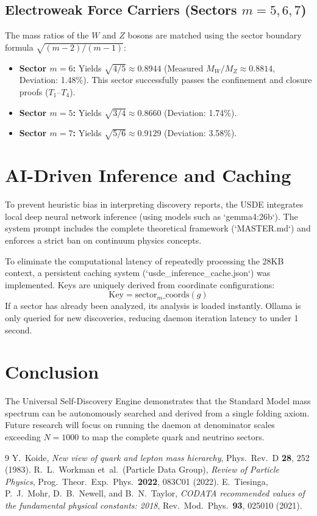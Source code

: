 \documentclass[11pt,a4paper]{article}
\begin{document}
\subsection{Electroweak Force Carriers (Sectors $m=5, 6, 7$)}
The mass ratios of the $W$ and $Z$ bosons are matched using the sector boundary formula $\sqrt{(m-2)/(m-1)}$:
\begin{itemize}
    \item \textbf{Sector $m=6$:} Yields $\sqrt{4/5} \approx 0.8944$ (Measured $M_W/M_Z \approx 0.8814$, Deviation: 1.48\%). This sector successfully passes the confinement and closure proofs ($T_1$--$T_4$).
    \item \textbf{Sector $m=5$:} Yields $\sqrt{3/4} \approx 0.8660$ (Deviation: 1.74\%).
    \item \textbf{Sector $m=7$:} Yields $\sqrt{5/6} \approx 0.9129$ (Deviation: 3.58\%).
\end{itemize}

\section{AI-Driven Inference and Caching}
To prevent heuristic bias in interpreting discovery reports, the USDE integrates local deep neural network inference (using models such as `gemma4:26b`). The system prompt includes the complete theoretical framework (`MASTER.md`) and enforces a strict ban on continuum physics concepts. 

To eliminate the computational latency of repeatedly processing the 28KB context, a persistent caching system (`usde_inference_cache.json`) was implemented. Keys are uniquely derived from coordinate configurations:
\begin{equation}
\text{Key} = \text{sector}_{m}\_\text{coords}(g)
\end{equation}
If a sector has already been analyzed, its analysis is loaded instantly. Ollama is only queried for new discoveries, reducing daemon iteration latency to under 1 second.

\section{Conclusion}
The Universal Self-Discovery Engine demonstrates that the Standard Model mass spectrum can be autonomously searched and derived from a single folding axiom. Future research will focus on running the daemon at denominator scales exceeding $N = 1000$ to map the complete quark and neutrino sectors.

\begin{thebibliography}{9}
 Y.~Koide, \textit{New view of quark and lepton mass hierarchy}, Phys.\ Rev.\ D \textbf{28}, 252 (1983).
 R.~L.~Workman et~al.\ (Particle Data Group), \textit{Review of Particle Physics}, Prog.\ Theor.\ Exp.\ Phys.\ \textbf{2022}, 083C01 (2022).
 E.~Tiesinga, P.~J.~Mohr, D.~B.~Newell, and B.~N.~Taylor, \textit{CODATA recommended values of the fundamental physical constants: 2018}, Rev.\ Mod.\ Phys.\ \textbf{93}, 025010 (2021).
\end{thebibliography}
\end{document}

